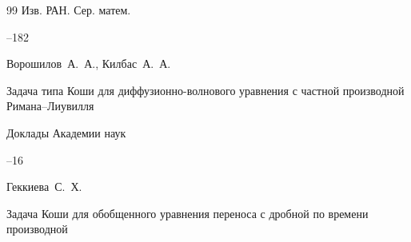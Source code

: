 \begin{thebibliography}{99}
\jour Изв. РАН. Сер. матем.




--182




















\by Ворошилов~А.~А., Килбас~А.~А.

\paper Задача типа Коши для диффузионно-волнового уравнения с частной производной  Римана--Лиувилля

\jour Доклады Академии наук




--16






\by Геккиева~С.~Х.

\paper Задача Коши для обобщенного уравнения переноса с дробной по времени производной


\end{thebibliography}

